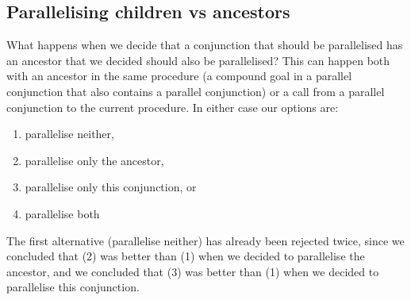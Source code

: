 %
%
%

\subsection{Parallelising children vs ancestors}
\label{sec:overlap_pragma_child_ancestor}

What happens when we decide that a conjunction that should be parallelised
has an ancestor that we decided should also be parallelised?
This can happen both with an ancestor in the same procedure (a compound goal
in a parallel conjunction that also contains a parallel conjunction)
or a call from a parallel conjunction to the current procedure.
In either case our options are:

\begin{enumerate}
\item parallelise neither,
\item parallelise only the ancestor,
\item parallelise only this conjunction, or
\item parallelise both
\end{enumerate}

The first alternative (parallelise neither) has already been rejected twice,
since we concluded that (2) was better than (1)
when we decided to parallelise the ancestor,
and we concluded that (3) was better than (1)
when we decided to parallelise this conjunction.

